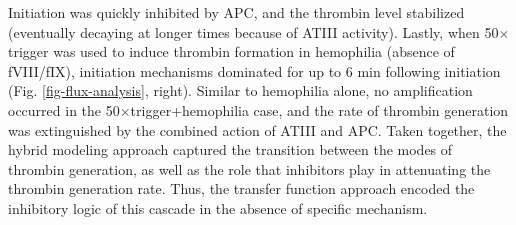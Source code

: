 \documentclass[12pt]{article}
\begin{document}
Initiation was quickly inhibited by APC, and the thrombin level stabilized (eventually decaying at longer times because of ATIII activity). 
Lastly, when 50$\times$trigger was used to induce thrombin formation in hemophilia (absence of fVIII/fIX), 
initiation mechanisms dominated for up to 6 min following initiation (Fig. \ref{fig-flux-analysis}, right). 
Similar to hemophilia alone, no amplification occurred in the 50$\times$trigger+hemophilia case, 
and the rate of thrombin generation was extinguished by the combined action of ATIII and APC. 
Taken together, the hybrid modeling approach captured the transition between the modes of thrombin generation, as well as the role that inhibitors play 
in attenuating the thrombin generation rate. Thus, the transfer function approach encoded the inhibitory logic of this cascade in the absence of specific mechanism.  

\clearpage
\end{document}
